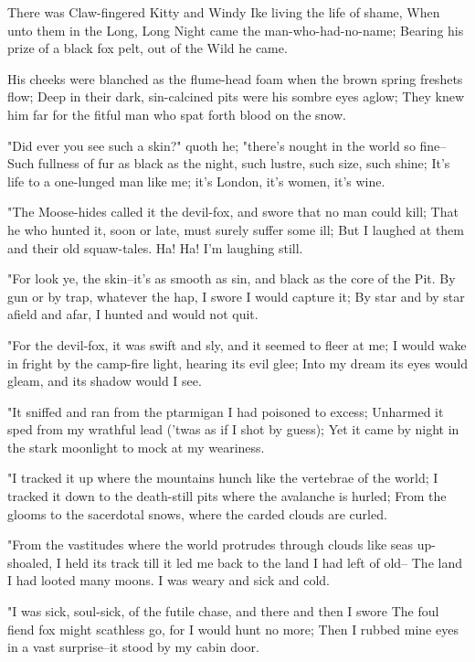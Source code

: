 
\begin{poemblock}
 There was Claw-fingered Kitty and Windy Ike living the life of shame,
 When unto them in the Long, Long Night came the man-who-had-no-name;
 Bearing his prize of a black fox pelt, out of the Wild he came.

 His cheeks were blanched as the flume-head foam
   when the brown spring freshets flow;
 Deep in their dark, sin-calcined pits were his sombre eyes aglow;
 They knew him far for the fitful man who spat forth blood on the snow.

 "Did ever you see such a skin?" quoth he;
   "there's nought in the world so fine--
 Such fullness of fur as black as the night,
   such lustre, such size, such shine;
 It's life to a one-lunged man like me; it's London, it's women, it's wine.

 "The Moose-hides called it the devil-fox, and swore that no man could kill;
 That he who hunted it, soon or late, must surely suffer some ill;
 But I laughed at them and their old squaw-tales.
   Ha!  Ha!  I'm laughing still.

 "For look ye, the skin--it's as smooth as sin,
   and black as the core of the Pit.
 By gun or by trap, whatever the hap, I swore I would capture it;
 By star and by star afield and afar, I hunted and would not quit.

 "For the devil-fox, it was swift and sly, and it seemed to fleer at me;
 I would wake in fright by the camp-fire light, hearing its evil glee;
 Into my dream its eyes would gleam, and its shadow would I see.

 "It sniffed and ran from the ptarmigan I had poisoned to excess;
 Unharmed it sped from my wrathful lead ('twas as if I shot by guess);
 Yet it came by night in the stark moonlight to mock at my weariness.

 "I tracked it up where the mountains hunch like the vertebrae of the world;
 I tracked it down to the death-still pits where the avalanche is hurled;
 From the glooms to the sacerdotal snows,
   where the carded clouds are curled.

 "From the vastitudes where the world protrudes
   through clouds like seas up-shoaled,
 I held its track till it led me back to the land I had left of old--
 The land I had looted many moons.  I was weary and sick and cold.

 "I was sick, soul-sick, of the futile chase, and there and then I swore
 The foul fiend fox might scathless go, for I would hunt no more;
 Then I rubbed mine eyes in a vast surprise--it stood by my cabin door.


\end{poemblock}
